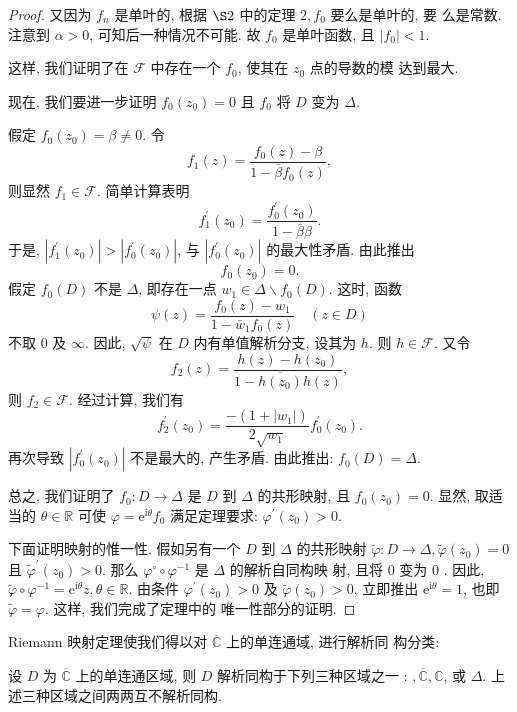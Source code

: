 \begin{proof}
又因为 $f_n$ 是单叶的, 根据 $\S 2$ 中的定理 $2, f_0$ 要么是单叶的, 要 么是常数. 注意到 $\alpha>0$, 可知后一种情况不可能. 故 $f_0$ 是单叶函数, 且 $\left|f_0\right|<1$.

这样, 我们证明了在 $\mathscr{F}$ 中存在一个 $f_0$, 使其在 $z_0$ 点的导数的模 达到最大.

现在, 我们要进一步证明 $f_0\left(z_0\right)=0$ 且 $f_0$ 将 $D$ 变为 $\Delta$. 

假定 $f_0\left(z_0\right)=\beta \neq 0$. 令
$$
f_1(z)=\frac{f_0(z)-\beta}{1-\bar{\beta} f_0(z)},
$$
则显然 $f_1 \in \mathscr{F}$. 简单计算表明
$$
f_1^{\prime}\left(z_0\right)=\frac{f_0^{\prime}\left(z_0\right)}{1-\bar{\beta} \beta} .
$$
于是, $\left|f_1^{\prime}\left(z_0\right)\right|>\left|f_0^{\prime}\left(z_0\right)\right|$, 与 $\left|f_0^{\prime}\left(z_0\right)\right|$ 的最大性矛盾. 由此推出
$$
f_0\left(z_0\right)=0 .
$$
假定 $f_0(D)$ 不是 $\Delta$, 即存在一点 $w_1 \in \Delta \backslash f_0(D)$. 这时, 函数
$$
\psi(z)=\frac{f_0(z)-w_1}{1-\bar{w}_1 f_0(z)} \quad(z \in D)
$$
不取 0 及 $\infty$. 因此, $\sqrt{\psi}$ 在 $D$ 内有单值解析分支, 设其为 $h$. 则 $h \in\mathscr{F}$.
又令
$$
f_2(z)=\frac{h(z)-h\left(z_0\right)}{1-\overline{h\left(z_0\right)} h(z)},
$$
则 $f_2 \in \mathscr{F}$. 经过计算, 我们有
$$
f_2^{\prime}\left(z_0\right)=\frac{-\left(1+\left|w_1\right|\right)}{2 \sqrt{w_1}} f_0^{\prime}\left(z_0\right) .
$$
再次导致 $\left|f_0^{\prime}\left(z_0\right)\right|$ 不是最大的, 产生矛盾. 由此推出: $f_0(D)=\Delta$.

总之, 我们证明了 $f_0: D \rightarrow \Delta$ 是 $D$ 到 $\Delta$ 的共形映射, 且 $f_0\left(z_0\right)=0$. 显然, 取适当的 $\theta \in \mathbb{R}$ 可使 $\varphi=\mathrm{e}^{\mathrm{i} \theta} f_0$ 满足定理要求: $\varphi^{\prime}\left(z_0\right)>0$. 

下面证明映射的惟一性. 假如另有一个 $D$ 到 $\Delta$ 的共形映射 $\tilde{\varphi}: D \rightarrow \Delta, \tilde{\varphi}\left(z_0\right)=0$ 且 $\tilde{\varphi}^{\prime}\left(z_0\right)>0$. 那么 $\varphi^{\circ} \circ \varphi^{-1}$ 是 $\Delta$ 的解析自同构映
射, 且将 $0$ 变为 $0$ . 因此, $\tilde{\varphi} \circ \varphi^{-1}=\mathrm{e}^{\mathrm{i} \theta} z, \theta \in \mathbb{R}$. 由条件 $\varphi^{\prime}\left(z_0\right)>0$ 及 $\tilde{\varphi}\left(z_0\right)>0$, 立即推出 $\mathrm{e}^{\mathrm{i} \theta}=1$, 也即 $\tilde{\varphi}=\varphi$. 这样, 我们完成了定理中的 唯一性部分的证明.
\end{proof}
Riemann 映射定理使我们得以对 $\overline{\mathbb{C}}$ 上的单连通域, 进行解析同 构分类:
\begin{thm}
    设 $D$ 为 $\overline{\mathbb{C}}$ 上的单连通区域, 则 $D$ 解析同构于下列三种区域之一 : $,\overline{\mathbb{C}}, \mathbb{C}$, 或 $\Delta$. 上述三种区域之间两两互不解析同构.
\end{thm}
